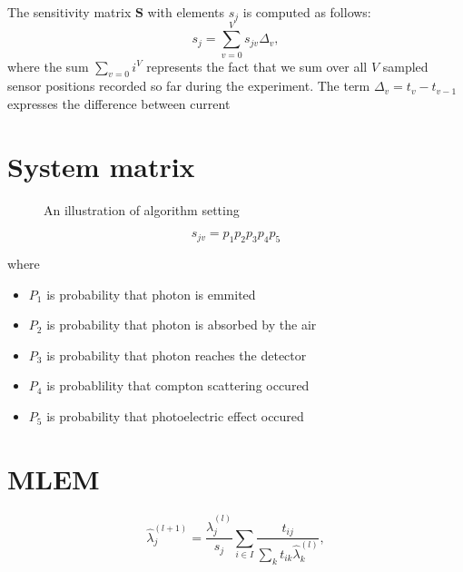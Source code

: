 The sensitivity matrix $\mathbf{S}$ with elements $s_{j}$ is computed as follows:
\begin{equation}
  s_{j} = \sum_{v = 0}^{V} s_{jv} \Delta_{v}, 
\end{equation}
where the sum $\sum_{v = 0}i^{V}$ represents the fact that we sum over all $V$ sampled sensor positions recorded so far during the experiment. 
The term $\Delta_{v} = t_{v} - t_{v-1}$ expresses the difference between current 



\section{System matrix}
\begin{figure}[!h]
  \centering

  \caption{An illustration of algorithm setting}
\end{figure}


\begin{equation}
  s_{jv} =  p_{1}p_{2}p_{3}p_{4}p_{5}
\end{equation}

where 
\begin{itemize}
  \item $P_{1}$ is probability that photon is emmited
  \item $P_{2}$ is probability that photon is absorbed by the air
  \item $P_{3}$ is probability that photon reaches the detector
  \item $P_{4}$ is probablility that compton scattering occured
  \item $P_{5}$ is probability that photoelectric effect occured
\end{itemize}






\section{MLEM}
\begin{equation}
\hat{\lambda}_{j}^{(l+1)} = \frac{\hat{\lambda}_{j}^{(l)}}{s_{j}} \sum_{i \in I} \frac{t_{ij}}{\sum_{k} t_{ik} \hat{\lambda}_{k}^{(l)}},
  \label{eq:MLEM}
\end{equation}

